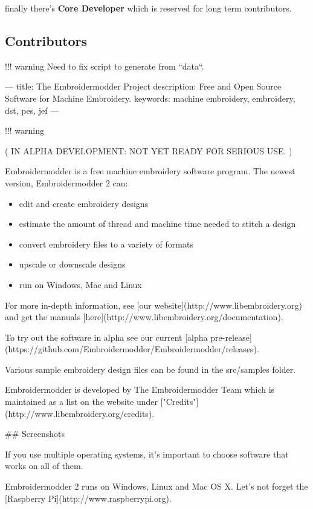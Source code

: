 finally there's \textbf{Core Developer} which is reserved for long term
contributors.

\subsection{Contributors}

!!! warning
    Need to fix script to generate from ``data``.

---
title: The Embroidermodder Project
description: Free and Open Source Software for Machine Embroidery.
keywords: machine embroidery, embroidery, dst, pes, jef
---

!!! warning

    ( IN ALPHA DEVELOPMENT: NOT YET READY FOR SERIOUS USE. )

Embroidermodder is a free machine embroidery software program.
The newest version, Embroidermodder 2 can:

\begin{itemize}
\item edit and create embroidery designs
\item estimate the amount of thread and machine time needed to stitch a design
\item convert embroidery files to a variety of formats
\item upscale or downscale designs
\item run on Windows, Mac and Linux
\end{itemize}

For more in-depth information, see [our website](http://www.libembroidery.org)
and get the manuals [here](http://www.libembroidery.org/documentation).

To try out the software in alpha see our current
[alpha pre-release](https://github.com/Embroidermodder/Embroidermodder/releases).

Various sample embroidery design files can be found in
the src/samples folder.

Embroidermodder is developed by The Embroidermodder Team which is maintained as a
list on the website under ["Credits"](http://www.libembroidery.org/credits).

## Screenshots

If you use multiple operating systems, it's important to choose software that works on all of them.

Embroidermodder 2 runs on Windows, Linux and Mac OS X. Let's not forget the [Raspberry
Pi](http://www.raspberrypi.org).

